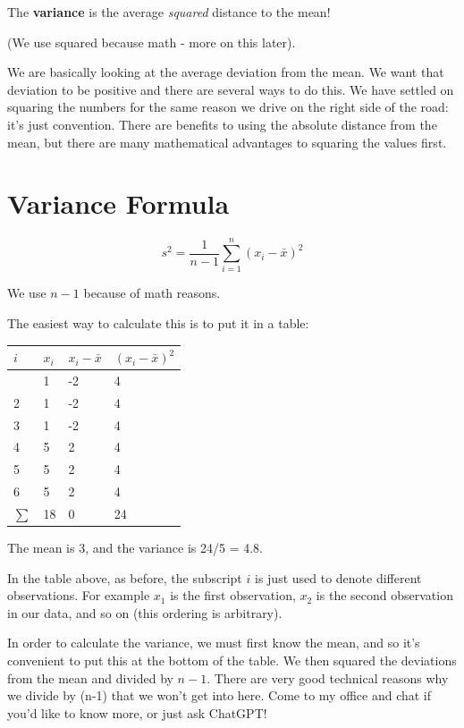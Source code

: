 \documentclass[
  letterpaper,
  DIV=11,
  numbers=noendperiod]{scrreprt}
\begin{document}
The \textbf{variance} is the average \emph{squared} distance to the
mean!

(We use squared because math - more on this later).

We are basically looking at the average deviation from the mean. We want
that deviation to be positive and there are several ways to do this. We
have settled on squaring the numbers for the same reason we drive on the
right side of the road: it's just convention. There are benefits to
using the absolute distance from the mean, but there are many
mathematical advantages to squaring the values first.

\hypertarget{variance-formula}{%
\section{Variance Formula}\label{variance-formula}}

\vspace{1.5cm}

\[
s^2 = \frac{1}{n-1}\sum_{i=1}^n(x_i - \bar x)^2
\]

\pspace

We use \(n-1\) because of math reasons.

The easiest way to calculate this is to put it in a table:

\begin{longtable}[]{@{}llll@{}}
\toprule\noalign{}
\(i\) & \(x_i\) & \(x_i - \bar x\) & \((x_i - \bar x)^2\) \\
\midrule\noalign{}
\endhead
\bottomrule\noalign{}
\endlastfoot
1 & 1 & -2 & 4 \\
2 & 1 & -2 & 4 \\
3 & 1 & -2 & 4 \\
4 & 5 & 2 & 4 \\
5 & 5 & 2 & 4 \\
6 & 5 & 2 & 4 \\
\(\sum\) & 18 & 0 & 24 \\
\end{longtable}

The mean is 3, and the variance is 24/5 = 4.8.

In the table above, as before, the subscript \(i\) is just used to
denote different observations. For example \(x_1\) is the first
observation, \(x_2\) is the second observation in our data, and so on
(this ordering is arbitrary).

In order to calculate the variance, we must first know the mean, and so
it's convenient to put this at the bottom of the table. We then squared
the deviations from the mean and divided by \(n-1\). There are very good
technical reasons why we divide by (n-1) that we won't get into here.
Come to my office and chat if you'd like to know more, or just ask
ChatGPT!
\end{document}

